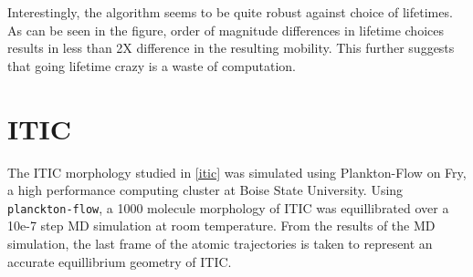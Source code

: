 Interestingly, the algorithm seems to be quite robust against choice of lifetimes. As can be seen in the
figure, order of magnitude differences in lifetime choices results in less than 2X difference in the resulting
mobility. This further suggests that going lifetime crazy is a waste of computation.  

\section{ITIC}
\label{itic}
The ITIC morphology studied in \autoref{itic} was simulated using Plankton-Flow \cite{cmelab} on Fry,         
a high performance computing cluster at Boise State University.  
Using \texttt{planckton-flow}, a 1000
molecule morphology of ITIC was equillibrated over a 10e-7 step MD simulation at room temperature. 
From the results of the MD
simulation, the last frame of the atomic trajectories is taken to represent an accurate equillibrium geometry
of ITIC. 

